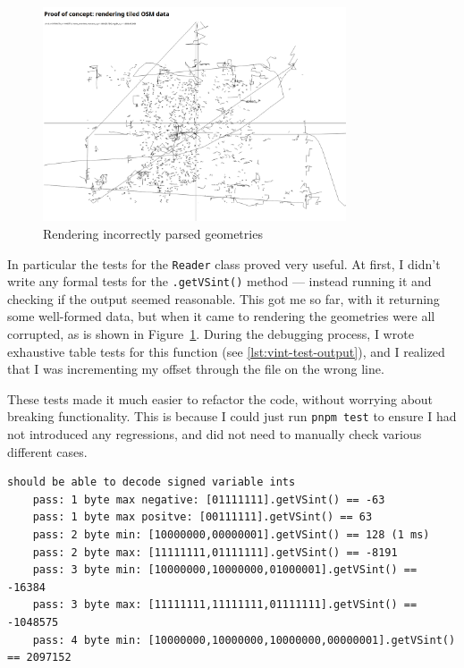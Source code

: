 \documentclass[hyphens]{final_report}
\begin{document}
\begin{figure}[ht]
    \centering
    \includegraphics[width=0.8\textwidth]{../proof-of-concepts/4-rendering-osm-data/screenshots/artifacts.png}
    \caption{Rendering incorrectly parsed geometries}\label{fig:artifacts}
\end{figure}

In particular the tests for the \texttt{Reader} class proved very useful. At first, I didn't write any formal tests for the \texttt{.getVSint()} method --- instead running it and checking if the output seemed reasonable. This got me so far, with it returning some well-formed data, but when it came to rendering the geometries were all corrupted, as is shown in Figure~\ref{fig:artifacts}. During the debugging process, I wrote exhaustive table tests for this function (see \autoref{lst:vint-test-output}), and I realized that I was incrementing my offset through the file on the wrong line.

These tests made it much easier to refactor the code, without worrying about breaking functionality. This is because I could just run \texttt{pnpm test} to ensure I had not introduced any regressions, and did not need to manually check various different cases.

\begin{lstlisting}[caption=Output from the \texttt{.getVSint()} test suite, numbers=none, label=lst:vint-test-output]
should be able to decode signed variable ints
    pass: 1 byte max negative: [01111111].getVSint() == -63
    pass: 1 byte max positve: [00111111].getVSint() == 63
    pass: 2 byte min: [10000000,00000001].getVSint() == 128 (1 ms)
    pass: 2 byte max: [11111111,01111111].getVSint() == -8191
    pass: 3 byte min: [10000000,10000000,01000001].getVSint() == -16384
    pass: 3 byte max: [11111111,11111111,01111111].getVSint() == -1048575
    pass: 4 byte min: [10000000,10000000,10000000,00000001].getVSint() == 2097152
\end{lstlisting}
\end{document}
